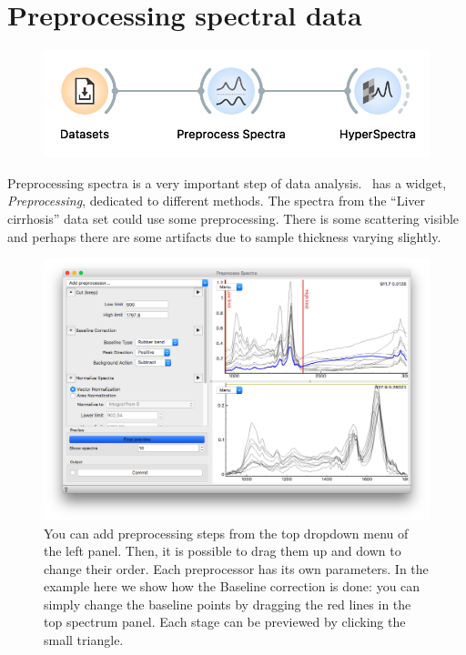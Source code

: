 \chapter{Preprocessing spectral data}
\label{ch:spectral_preprocessing}


\begin{figure}
    \centering
    \vspace{-3.4cm}
    \includegraphics[scale=0.55]{spectral_preprocessing-fig1.png}
    \label{fig:spectral_preprocessing-fig1}
\end{figure}

Preprocessing spectra is a very important step of data analysis. \mutation\ has a widget, \textit{Preprocessing}, dedicated to different methods. The spectra from the ``Liver cirrhosis'' data set could use some preprocessing. There is some scattering visible and perhaps there are some artifacts due to sample thickness varying slightly.

\begin{figure}[h]
    \vspace{-0.2cm}
    \includegraphics[scale=0.28]{spectral_preprocessing-fig2.png}
    \caption{You can add preprocessing steps from the top dropdown menu of the left panel. Then, it is possible to drag them up and down to change their order. Each preprocessor has its own parameters. In the example here we show how the Baseline correction is done: you can simply change the baseline points by dragging the red lines in the top spectrum panel. Each stage can be previewed by clicking the small triangle.}
    \label{fig:spectral_preprocessing-fig2}
\end{figure}


